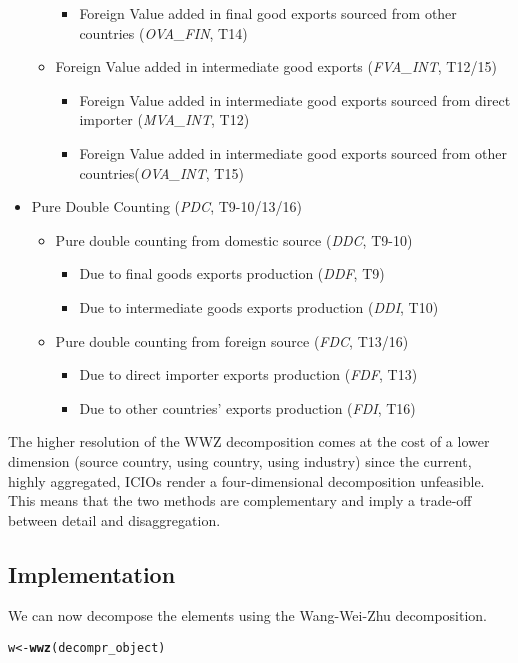 \documentclass{article}\usepackage[]{graphicx}\usepackage[]{color}
\makeatletter
\newcommand{\hlstd}[1]{\textcolor[rgb]{0.345,0.345,0.345}{#1}}%
\newcommand{\hlkwb}[1]{\textcolor[rgb]{0.69,0.353,0.396}{#1}}%
\newcommand{\hlkwd}[1]{\textcolor[rgb]{0.737,0.353,0.396}{\textbf{#1}}}%
\newenvironment{kframe}{%
 \def\at@end@of@kframe{}%
 \ifinner\ifhmode%
  \def\at@end@of@kframe{\end{minipage}}%
  \begin{minipage}{\columnwidth}%
 \fi\fi%
 \def\FrameCommand##1{\hskip\@totalleftmargin \hskip-\fboxsep
 \colorbox{shadecolor}{##1}\hskip-\fboxsep
     \hskip-\linewidth \hskip-\@totalleftmargin \hskip\columnwidth}%
 \MakeFramed {\advance\hsize-\width
   \@totalleftmargin\z@ \linewidth\hsize
   \@setminipage}}%
 {\par\unskip\endMakeFramed%
 \at@end@of@kframe}
\newenvironment{knitrout}{}{} %
\makeatother
\begin{document}
\begin{itemize}
\begin{itemize}
\begin{itemize}
\item Foreign Value added in final good exports sourced from other countries (\textit{OVA\_FIN}, T14)
\end{itemize}
\item Foreign Value added in intermediate good exports (\textit{FVA\_INT}, T12/15)
\begin{itemize}
\item Foreign Value added in intermediate good exports sourced from direct importer (\textit{MVA\_INT}, T12)
\item Foreign Value added in intermediate good exports sourced from other countries(\textit{OVA\_INT}, T15)
\end{itemize}
\end{itemize}
\item Pure Double Counting (\textit{PDC}, T9-10/13/16)
\begin{itemize}
\item Pure double counting from domestic source (\textit{DDC}, T9-10)
\begin{itemize}
\item Due to final goods exports production (\textit{DDF}, T9)
\item Due to intermediate goods exports production (\textit{DDI}, T10)
\end{itemize}
\item Pure double counting from foreign source (\textit{FDC}, T13/16)
\begin{itemize}
\item Due to direct importer exports production (\textit{FDF}, T13)
\item Due to other countries' exports production (\textit{FDI}, T16)
\end{itemize}
\end{itemize}
\end{itemize}
The higher resolution of the WWZ decomposition comes at the cost of a lower dimension (source country, using country, using industry) since the current, highly aggregated, ICIOs render a four-dimensional decomposition unfeasible. This means that the two methods are complementary and imply a trade-off between detail and disaggregation.

\subsection{Implementation}
We can now decompose the elements using the Wang-Wei-Zhu decomposition.

\begin{knitrout}
\color{fgcolor}\begin{kframe}
\begin{alltt}
\hlstd{w} \hlkwb{<-} \hlkwd{wwz}\hlstd{(decompr_object)}
\end{alltt}
\end{kframe}
\end{knitrout}
\end{document}
